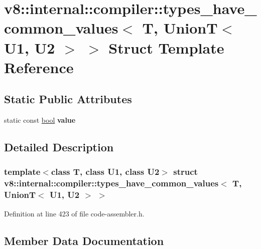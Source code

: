\hypertarget{structv8_1_1internal_1_1compiler_1_1types__have__common__values_3_01T_00_01UnionT_3_01U1_00_01U2_01_4_01_4}{}\section{v8\+:\+:internal\+:\+:compiler\+:\+:types\+\_\+have\+\_\+common\+\_\+values$<$ T, UnionT$<$ U1, U2 $>$ $>$ Struct Template Reference}
\label{structv8_1_1internal_1_1compiler_1_1types__have__common__values_3_01T_00_01UnionT_3_01U1_00_01U2_01_4_01_4}
\subsection*{Static Public Attributes}
\begin{DoxyCompactItemize}
\item 
static const \mbox{\hyperlink{classbool}{bool}} {\bfseries value}
\end{DoxyCompactItemize}


\subsection{Detailed Description}
\subsubsection*{template$<$class T, class U1, class U2$>$\newline
struct v8\+::internal\+::compiler\+::types\+\_\+have\+\_\+common\+\_\+values$<$ T, Union\+T$<$ U1, U2 $>$ $>$}



Definition at line 423 of file code-\/assembler.\+h.



\subsection{Member Data Documentation}
\mbox{\label{structv8_1_1internal_1_1compiler_1_1types__have__common__values_3_01T_00_01UnionT_3_01U1_00_01U2_01_4_01_4_a91198d22371d872c6b85e88b5991f0b6}} 
